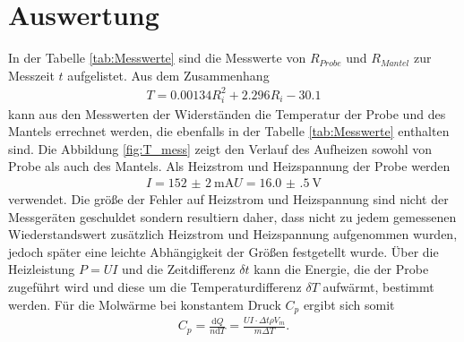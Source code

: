 \section{Auswertung}
\label{sec:Auswertung}

In der Tabelle \ref{tab:Messwerte} sind die Messwerte von
$R_{Probe}$ und $R_{Mantel}$ zur Messzeit $t$ aufgelistet.
Aus dem Zusammenhang
\begin{align}
  T=\num{0.00134} R_i^2 + \num{2.296} R_i - \num{30.1} \label{eqn:inKelvin}
\end{align}
kann aus den Messwerten der Widerständen
die Temperatur der Probe und
des Mantels errechnet werden, die ebenfalls in der
Tabelle \ref{tab:Messwerte} enthalten sind.
Die Abbildung \ref{fig:T_mess} zeigt den
Verlauf des Aufheizen sowohl von Probe
als auch des Mantels.
Als Heizstrom und Heizspannung der Probe
werden
\begin{align}
  I = \SI{152(2)}{\milli\ampere}
  U = \SI{16.0(5)}{\volt}
\end{align}
verwendet. Die größe
der Fehler auf Heizstrom und Heizspannung
sind nicht der Messgeräten geschuldet
sondern resultiern daher, dass nicht
zu jedem gemessenen Wiederstandswert
zusätzlich Heizstrom und Heizspannung
aufgenommen wurden, jedoch später
eine leichte Abhängigkeit
der Größen festgetellt wurde.
Über die Heizleistung $P=UI$
und die Zeitdifferenz $\delta t$
kann die Energie, die der Probe zugeführt wird
und diese um die Temperaturdifferenz
$\delta T$ aufwärmt, bestimmt werden.
Für die Molwärme bei konstantem
Druck $C_p$ ergibt sich somit
\begin{align}
  C_p =\frac{\text{d} Q}{n \text{d} T }  = \frac{UI \cdot \Delta t \rho V_m }{m \Delta T}.
\end{align}

